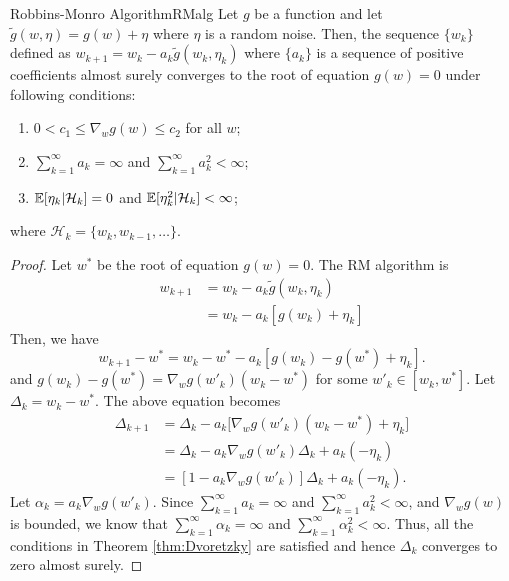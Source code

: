     \begin{thm}{Robbins-Monro Algorithm}{RMalg}
        Let $g$ be a function and let $\tilde{g}(w, \eta) = g(w) + \eta$ where $\eta$ is a random noise.
        Then, the sequence $\{w_k\}$ defined as $w_{k+1} = w_k - a_k \tilde{g}(w_k, \eta_k)$
        where $\{a_k\}$ is a sequence of positive coefficients almost surely converges to the root of equation $g(w)=0$
        under following conditions:
        \begin{enumerate}
            \item $0 < c_1 \leq \nabla_w g(w) \leq c_2$ for all $w$;
            \item $\sum_{k=1}^{\infty}a_k = \infty$ and $\sum_{k=1}^{\infty}a_k^2 < \infty$;
            \item $\mathbb{E}[\eta_k|\mathcal{H}_k]=0$ and $\mathbb{E}[\eta_k^2|\mathcal{H}_k] < \infty$; 
        \end{enumerate}
        where $\mathcal{H}_k = \{w_k, w_{k-1}, \dots\}$.
    \end{thm}
    \begin{proof}
        Let $w^*$ be the root of equation $g(w)=0$. The RM algorithm is
        \begin{align}
            w_{k+1} &= w_k - a_k\tilde{g}(w_k,\eta_k) \\
                    &= w_k - a_k[g(w_k) + \eta_k]
        \end{align}
        Then, we have
        \begin{equation}
            w_{k+1} - w^* = w_k - w^* - a_k[g(w_k)-g(w^*)+\eta_k].
        \end{equation}
        and $g(w_k)-g(w^*) = \nabla_wg(w'_k)(w_k-w^*)$ for some $w'_k \in [w_k,w^*]$. Let $\Delta_k = w_k - w^*$. The above equation becomes
        \begin{align}
            \Delta_{k+1} &= \Delta_k - a_k\big[ \nabla_wg(w'_k)(w_k-w^*)+\eta_k\big] \\
                         &= \Delta_k - a_k\nabla_wg(w'_k)\Delta_k + a_k(-\eta_k) \\
                         &= [1-a_k\nabla_wg(w'_k)]\Delta_k + a_k(-\eta_k).
        \end{align}
        Let $\alpha_k = a_k\nabla_wg(w'_k)$. Since $\sum_{k=1}^{\infty}a_k = \infty$ and $\sum_{k=1}^{\infty}a_k^2 < \infty$,
        and $\nabla_w g(w)$ is bounded, we know that $\sum_{k=1}^{\infty}\alpha_k=\infty$ and $\sum_{k=1}^\infty\alpha_k^2 < \infty$. Thus, all the conditions in
        Theorem \ref{thm:Dvoretzky} are satisfied and hence $\Delta_k$ converges to zero almost surely.
    \end{proof}

